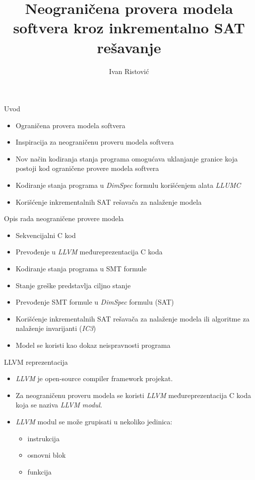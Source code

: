 \documentclass{beamer}
\title{Neograničena provera modela softvera kroz inkrementalno SAT rešavanje}
\author{Ivan Ristovi\'c}
\date{}
\begin{document}
\begin{frame}
    \titlepage
\end{frame}

\begin{frame}{Uvod}
    \begin{itemize}
        \item Ograničena provera modela softvera
        \item Inspiracija za neograničenu proveru modela softvera
        \item Nov način kodiranja stanja programa omogućava uklanjanje granice koja postoji kod ograničene provere modela softvera
        \item Kodiranje stanja programa u \emph{DimSpec} formulu korišćenjem alata \emph{LLUMC}
        \item Korišćenje inkrementalnih SAT rešavača za nalaženje modela
    \end{itemize}
\end{frame}

\begin{frame}{Opis rada neograničene provere modela}
    \begin{itemize}
        \item Sekvencijalni C kod
        \item Prevođenje u \emph{LLVM} međureprezentacija C koda
        \item Kodiranje stanja programa u SMT formule
        \item Stanje greške predstavlja ciljno stanje
        \item Prevođenje SMT formule u \emph{DimSpec} formulu (SAT)
        \item Korišćenje inkrementalnih SAT rešavača za nalaženje modela ili algoritme za nalaženje invarijanti (\emph{IC3})
        \item Model se koristi kao dokaz neispravnosti programa
    \end{itemize}
\end{frame}

\begin{frame}{LLVM reprezentacija}
    \begin{itemize}
        \item \emph{LLVM} je open-source compiler framework projekat.
        \item Za neograničenu proveru modela se koristi \emph{LLVM} međureprezentacija C koda koja se naziva \emph{LLVM modul}.
        \item \emph{LLVM} modul se može grupisati u nekoliko jedinica:
            \begin{itemize}
                \item instrukcija
                \item osnovni blok
                \item funkcija
            \end{itemize}
    \end{itemize}
\end{frame}
\end{document}
